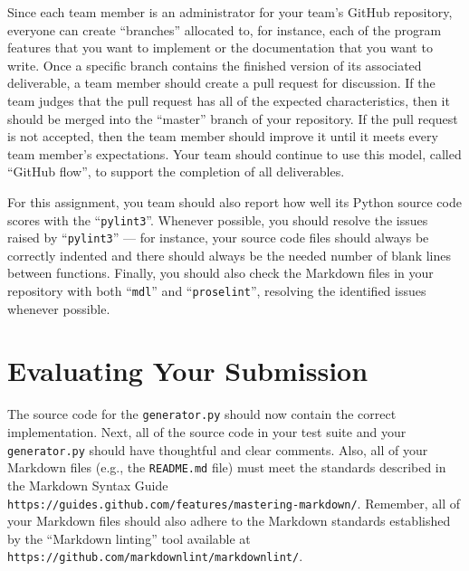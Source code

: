 \documentclass[11pt]{article}
\newcommand{\mainprogram}{\lstinline{generator.py}}
\newcommand{\reflection}{\lstinline{README.md}}
\newcommand{\command}[1]{``\lstinline{#1}''}
\newcommand{\url}[1]{\lstinline{#1}}
\newcommand{\step}[1]{``{#1}''}
\begin{document}
Since each team member is an administrator for your team's GitHub repository, everyone can create ``branches'' allocated
to, for instance, each of the program features that you want to implement or the documentation that you want to write.
Once a specific branch contains the finished version of its associated deliverable, a team member should create a pull
request for discussion. If the team judges that the pull request has all of the expected characteristics, then it should
be merged into the ``master'' branch of your repository. If the pull request is not accepted, then the team member
should improve it until it meets every team member's expectations. Your team should continue to use this model, called
``GitHub flow'', to support the completion of all deliverables.

For this assignment, you team should also report how well its Python source code scores with the \command{pylint3}.
Whenever possible, you should resolve the issues raised by \command{pylint3} --- for instance, your source code files
should always be correctly indented and there should always be the needed number of blank lines between functions.
Finally, you should also check the Markdown files in your repository with both \command{mdl} and \command{proselint},
resolving the identified issues whenever possible.

\section*{Evaluating Your Submission}

The source code for the \mainprogram{} should now contain the correct implementation. Next, all of the source code in
your test suite and your \mainprogram{} should have thoughtful and clear comments. Also, all of your Markdown files
(e.g., the \reflection{} file) must meet the standards described in the Markdown Syntax Guide
\url{https://guides.github.com/features/mastering-markdown/}. Remember, all of your Markdown files should also adhere to
the Markdown standards established by the \step{Markdown linting} tool available at
\url{https://github.com/markdownlint/markdownlint/}.
\end{document}
